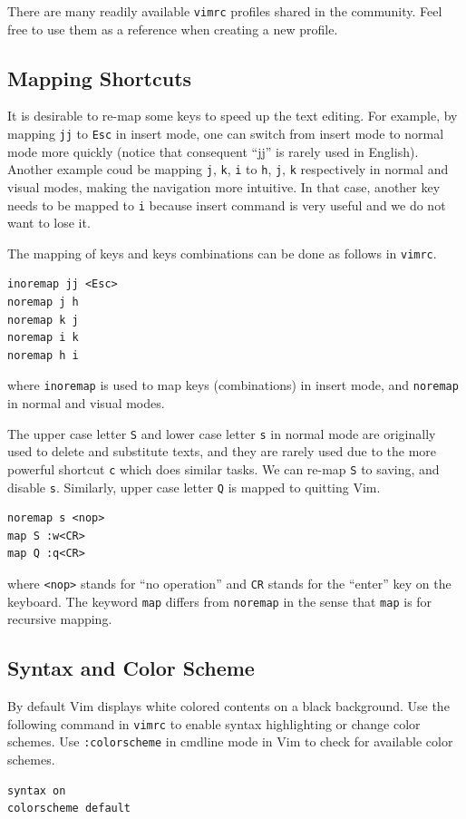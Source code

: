 There are many readily available \verb|vimrc| profiles shared in the community. Feel free to use them as a reference when creating a new profile.

\subsection{Mapping Shortcuts}

It is desirable to re-map some keys to speed up the text editing. For example, by mapping \verb|jj| to \verb|Esc| in insert mode, one can switch from insert mode to normal mode more quickly (notice that consequent ``jj'' is rarely used in English). Another example coud be mapping \verb|j|, \verb|k|, \verb|i| to \verb|h|, \verb|j|, \verb|k| respectively in normal and visual modes, making the navigation more intuitive. In that case, another key needs to be mapped to \verb|i| because insert command is very useful and we do not want to lose it.

The mapping of keys and keys combinations can be done as follows in \verb|vimrc|.
\begin{lstlisting}
inoremap jj <Esc>
noremap j h
noremap k j
noremap i k
noremap h i
\end{lstlisting}
where \verb|inoremap| is used to map keys (combinations) in insert mode, and \verb|noremap| in normal and visual modes.

The upper case letter \verb|S| and lower case letter \verb|s| in normal mode are originally used to delete and substitute texts, and they are rarely used due to the more powerful shortcut \verb|c| which does similar tasks. We can re-map \verb|S| to saving, and disable \verb|s|. Similarly, upper case letter \verb|Q| is mapped to quitting Vim.
\begin{lstlisting}
noremap s <nop>
map S :w<CR>
map Q :q<CR>
\end{lstlisting}
where \verb|<nop>| stands for ``no operation'' and \verb|CR| stands for the ``enter'' key on the keyboard. The keyword \verb|map| differs from \verb|noremap| in the sense that \verb|map| is for recursive mapping.

\subsection{Syntax and Color Scheme}

By default Vim displays white colored contents on a black background. Use the following command in \verb|vimrc| to enable syntax highlighting or change color schemes. Use \verb|:colorscheme| in cmdline mode in Vim to check for available color schemes.
\begin{lstlisting}
syntax on
colorscheme default
\end{lstlisting}


